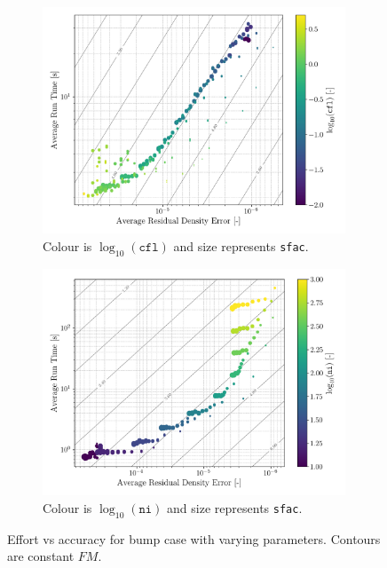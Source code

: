 \documentclass{article}
\begin{document}
\begin{figure}[H]
    \begin{subfigure}{0.49\textwidth}
        \centering
        \includegraphics[width=0.99\textwidth]{figures/effort_vs_accuracy_cfl.png}
        \caption{Colour is $\log_{10}( \texttt{cfl})$ and size represents \texttt{sfac}.}
        \label{fig:effort_vs_accuracy_cfl}
    \end{subfigure}
    \begin{subfigure}{0.49\textwidth}
        \centering
        \includegraphics[width=0.99\textwidth]{figures/effort_vs_accuracy_ni.png}
        \caption{Colour is $\log_{10}( \texttt{ni})$ and size represents \texttt{sfac}.}
        \label{fig:effort_vs_accuracy_ni}
    \end{subfigure}
    \caption{Effort vs accuracy for bump case with varying parameters. Contours are constant $FM$.}
    \label{fig:effort_vs_accuracy_1}
\end{figure}
\end{document}
